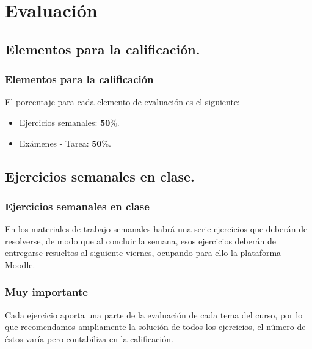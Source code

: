 \section{Evaluación}

\subsection{Elementos para la calificación.}
\begin{frame}
\frametitle{Elementos para la calificación}
El porcentaje para cada elemento de evaluación es el siguiente:
\begin{itemize}
\setlength{\itemsep}{0mm}
\item Ejercicios semanales: $\mathbf{50\%}$.
\item Exámenes - Tarea: $\mathbf{50\%}$.
\end{itemize}
\end{frame}

\subsection{Ejercicios semanales en clase.}

\begin{frame}
\frametitle{Ejercicios semanales en clase}
En los materiales de trabajo semanales habrá una serie ejercicios que deberán de resolverse, de modo que al concluir la semana, esos ejercicios deberán de entregarse resueltos al siguiente viernes, ocupando para ello la plataforma Moodle.
\end{frame}
\begin{frame}
\frametitle{Muy importante}
Cada ejercicio aporta una parte de la evaluación de cada tema del curso, por lo que recomendamos ampliamente la solución de todos los ejercicios, el número de éstos varía pero contabiliza en la calificación.
\end{frame}
